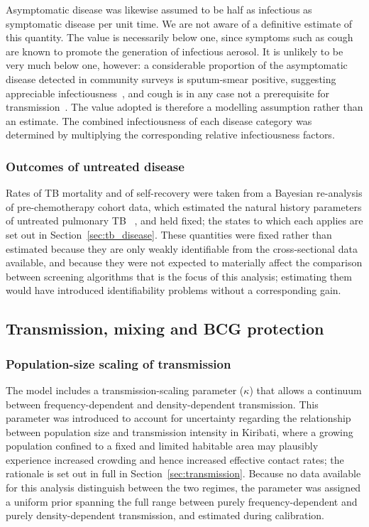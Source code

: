 Asymptomatic disease was likewise assumed to be half as infectious as symptomatic disease per unit time. We are not aware of a definitive estimate of this quantity. The value is necessarily below one, since symptoms such as cough are known to promote the generation of infectious aerosol. It is unlikely to be very much below one, however: a considerable proportion of the asymptomatic disease detected in community surveys is sputum-smear positive, suggesting appreciable infectiousness~\cite{stuck2024}, and cough is in any case not a prerequisite for transmission~\cite{patterson2019}. The value adopted is therefore a modelling assumption rather than an estimate. The combined infectiousness of each disease category was determined by multiplying the corresponding relative infectiousness factors.

\subsubsection{Outcomes of untreated disease}

Rates of TB mortality and of self-recovery were taken from a Bayesian re-analysis of pre-chemotherapy cohort data, which estimated the natural history parameters of untreated pulmonary TB ~\cite{ragonnet2021}, and held fixed; the states to which each applies are set out in Section~\ref{sec:tb_disease}. These quantities were fixed rather than estimated because they are only weakly identifiable from the cross-sectional data available, and because they were not expected to materially affect the comparison between screening algorithms that is the focus of this analysis; estimating them would have introduced identifiability problems without a corresponding gain.

\subsection{Transmission, mixing and BCG protection}

\subsubsection{Population-size scaling of transmission}
\label{sec:popscaling}

The model includes a transmission-scaling parameter (\(\kappa\)) that allows a continuum between frequency-dependent and density-dependent transmission. This parameter was introduced to account for uncertainty regarding the relationship between population size and transmission intensity in Kiribati, where a growing population confined to a fixed and limited habitable area may plausibly experience increased crowding and hence increased effective contact rates; the rationale is set out in full in Section~\ref{sec:transmission}. Because no data available for this analysis distinguish between the two regimes, the parameter was assigned a uniform prior spanning the full range between purely frequency-dependent and purely density-dependent transmission, and estimated during calibration.

